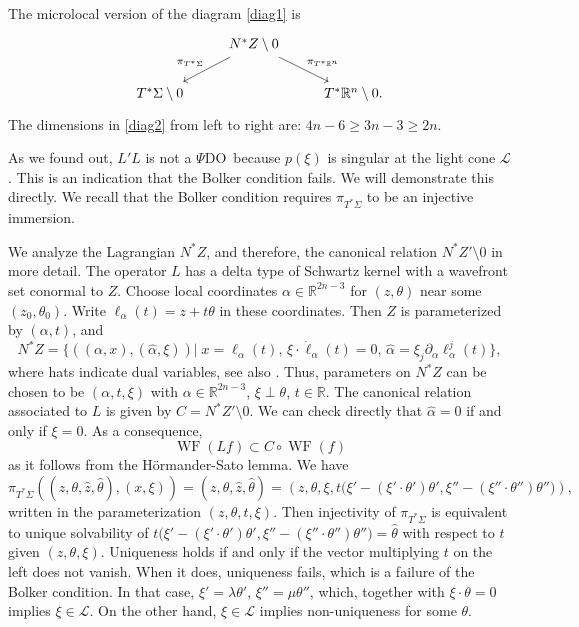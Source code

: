 \documentclass[11pt]{amsart}
\theoremstyle{definition}
\theoremstyle{remark}
\numberwithin{equation}{section}
\newcommand{\be}[1]{\begin{equation}\label{#1}}
\newcommand{\ee}{\end{equation}}
\DeclareMathOperator{\WF}{WF}
\newcommand{\rb}{\mathbb{R}}
\newcommand{\PDO}{{\rm $\Psi$DO}}
\begin{document}
The microlocal version of the diagram \eqref{diag1} is
\begin{equation} \label{diag2}
	\begin{tikzcd}[]
		&  N^*Z\setminus 0 \arrow{dl}[swap]{\pi_{T^*\Sigma}}\arrow{dr}{\pi_{T^*\rb^n}} & \\
		T^*\Sigma\setminus 0 
		& &T^*\rb^n\setminus 0.
	\end{tikzcd} 
\end{equation}
The dimensions in \eqref{diag2} from left to right are: $4n-6\ge 3n-3\ge  2n$. 

As we found out, $L'L$ is not a \PDO\ because $p(\xi)$ is singular at the light cone $\mathcal L$. This is an indication that the Bolker condition fails. We will demonstrate this directly. We recall that the Bolker condition requires $\pi_{T^*\Sigma}$ to be an injective immersion. 


We analyze the Lagrangian $N^*Z$, and therefore, the canonical relation $N^*Z'\setminus 0$ in more detail. 
The operator $L$ has a delta type of Schwartz kernel with a wavefront set conormal to $Z$. Choose local coordinates $\alpha\in \rb^{2n-3}$ for $(z,\theta)$ near some $(z_0,\theta_0)$. Write $\ell_\alpha(t)=z+t\theta$ in these coordinates.  Then $Z$ is parameterized by $(\alpha,t)$, and
\begin{equation} \label{MA_light_2}
N^*Z = \Big\{  ((\alpha,x) , ({\hat \alpha},\xi )     )\big| \; x=\ell_\alpha(t) ,\,  \xi\cdot\dot\ell_\alpha(t)=0,\, \hat\alpha= \xi_j\partial_\alpha\ell^j_\alpha(t)  \Big\},
\end{equation}
where hats indicate dual variables, see also \cite{SU-book}. Thus, parameters on $N^*Z$ can be chosen to be $(\alpha,t,\xi)$ with $\alpha\in \rb^{2n-3}$,   $\xi\perp\theta$, $t\in\rb$. 
The canonical relation associated to $L$ is given by $C = N^*Z'\setminus 0$. 
We can check directly that  $\hat \alpha=0$ if and only if $\xi=0$.   
As a consequence, 
\be{MA_light_4}
\WF(L f) \subset C\circ \WF(f)
\ee
as it follows from the H\"ormander-Sato lemma. We have
\be{MA_light_6}
\pi_{T^*\Sigma} ((z,\theta,{\hat z},\hat\theta) , (x, \xi )) =     (z,\theta,{\hat z},\hat\theta)   = \left(z,\theta,\xi, t\big(\xi' -(\xi'\cdot\theta') \theta' , \xi'' -(\xi''\cdot\theta'') \theta''\big) \right) ,
\ee
written in the parameterization  $(z,\theta,t,\xi)$. Then injectivity of $\pi_{T^*\Sigma} $ is equivalent to unique solvability of $t\big(\xi' -(\xi'\cdot\theta') \theta' , \xi'' -(\xi''\cdot\theta'') \theta''\big)  =  \hat\theta$ with respect to $t$ given $(z,\theta,\xi)$. Uniqueness holds if and only if the vector multiplying $t$ on the left does not vanish.  When it does, uniqueness fails, which is a failure of the Bolker condition. In that case, $\xi'=\lambda\theta'$, $\xi''=\mu\theta''$, which, together with $\xi\cdot\theta=0$ implies $\xi\in\mathcal{L}$. On the other hand, $\xi\in\mathcal{L}$ implies non-uniqueness for some $\theta$. 
 
\end{document}
